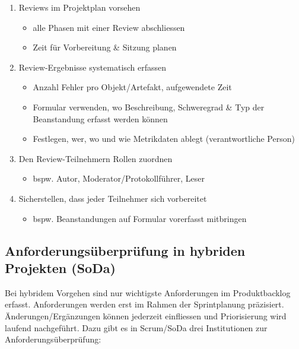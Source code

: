 \documentclass[a4paper]{article}
\begin{document}
					\begin{enumerate}
						\item Reviews im Projektplan vorsehen
							\begin{itemize}
								\item alle Phasen mit einer Review abschliessen
								\item Zeit für Vorbereitung \& Sitzung planen
							\end{itemize}
						\item Review-Ergebnisse systematisch erfassen
							\begin{itemize}
								\item Anzahl Fehler pro Objekt/Artefakt, aufgewendete Zeit
								\item Formular verwenden, wo Beschreibung, Schweregrad \& Typ der Beanstandung erfasst werden können
								\item Festlegen, wer, wo und wie Metrikdaten ablegt (verantwortliche Person)
							\end{itemize}
						\item Den Review-Teilnehmern Rollen zuordnen
							\begin{itemize}
								\item bspw. Autor, Moderator/Protokollführer, Leser
							\end{itemize}
						\item Sicherstellen, dass jeder Teilnehmer sich vorbereitet
							\begin{itemize}
								\item bspw. Beanstandungen auf Formular vorerfasst mitbringen
							\end{itemize}
					\end{enumerate}
				
		\subsection{Anforderungsüberprüfung in hybriden Projekten (SoDa)}
		
		Bei hybridem Vorgehen sind nur wichtigste Anforderungen im Produktbacklog erfasst.
		Anforderungen werden erst im Rahmen der Sprintplanung präzisiert.
		Änderungen/Ergänzungen können jederzeit einfliessen und Priorisierung wird laufend nachgeführt.
		Dazu gibt es in Scrum/SoDa drei Institutionen zur Anforderungsüberprüfung:
		
\end{document}
